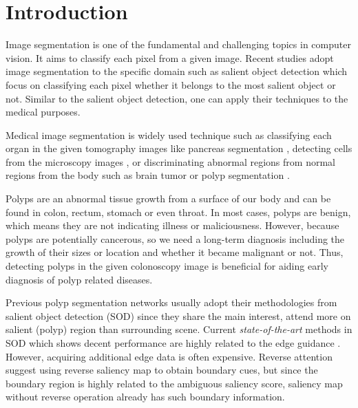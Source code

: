 \documentclass[sigconf]{acmart}
\begin{document}


\maketitle

\section{Introduction}
Image segmentation is one of the fundamental and challenging topics in computer vision. It aims to classify each pixel from a given image. Recent studies adopt image segmentation to the specific domain such as salient object detection which focus on classifying each pixel whether it belongs to the most salient object or not. Similar to the salient object detection, one can apply their techniques to the medical purposes.

Medical image segmentation is widely used technique such as classifying each organ in the given tomography images like pancreas segmentation \cite{oktay2018attention}, detecting cells from the microscopy images \cite{ronneberger2015u}, or discriminating abnormal regions from normal regions from the body such as brain tumor \cite{haghighi2020learning} or polyp segmentation \cite{fan2020pranet}.

Polyps are an abnormal tissue growth from a surface of our body and can be found in colon, rectum, stomach or even throat. In most cases, polyps are benign, which means they are not indicating illness or maliciousness. However, because polyps are potentially cancerous, so we need a long-term diagnosis including the growth of their sizes or location and whether it became malignant or not. Thus, detecting polyps in the given colonoscopy image is beneficial for aiding early diagnosis of polyp related diseases.

Previous polyp segmentation networks usually adopt their methodologies from salient object detection (SOD) since they share the main interest, attend more on salient (polyp) region than surrounding scene. Current \textit{state-of-the-art} methods in SOD which shows decent performance are highly related to the edge guidance \cite{yang2017edge, su2019selectivity}. However, acquiring additional edge data is often expensive. Reverse attention \cite{chen2018reverse} suggest using reverse saliency map to obtain boundary cues, but since the boundary region is highly related to the ambiguous saliency score, saliency map without reverse operation already has such boundary information.
\end{document}
